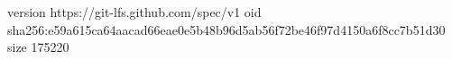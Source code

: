 version https://git-lfs.github.com/spec/v1
oid sha256:e59a615ca64aacad66eae0e5b48b96d5ab56f72be46f97d4150a6f8cc7b51d30
size 175220
